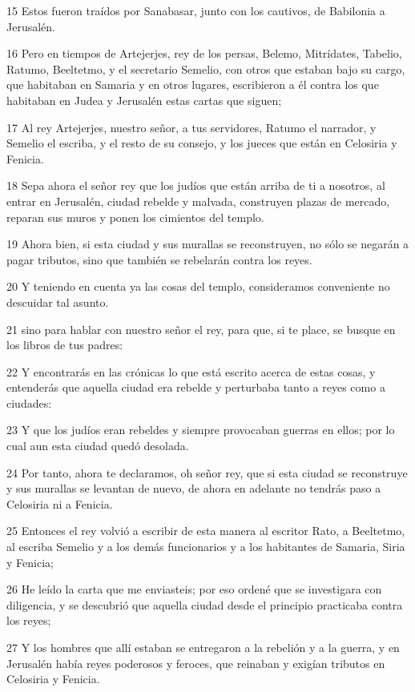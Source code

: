 \par 15 Estos fueron traídos por Sanabasar, junto con los cautivos, de Babilonia a Jerusalén.
\par 16 Pero en tiempos de Artejerjes, rey de los persas, Belemo, Mitrídates, Tabelio, Ratumo, Beeltetmo, y el secretario Semelio, con otros que estaban bajo su cargo, que habitaban en Samaria y en otros lugares, escribieron a él contra los que habitaban en Judea y Jerusalén estas cartas que siguen;
\par 17 Al rey Artejerjes, nuestro señor, a tus servidores, Ratumo el narrador, y Semelio el escriba, y el resto de su consejo, y los jueces que están en Celosiria y Fenicia.
\par 18 Sepa ahora el señor rey que los judíos que están arriba de ti a nosotros, al entrar en Jerusalén, ciudad rebelde y malvada, construyen plazas de mercado, reparan sus muros y ponen los cimientos del templo.
\par 19 Ahora bien, si esta ciudad y sus murallas se reconstruyen, no sólo se negarán a pagar tributos, sino que también se rebelarán contra los reyes.
\par 20 Y teniendo en cuenta ya las cosas del templo, consideramos conveniente no descuidar tal asunto.
\par 21 sino para hablar con nuestro señor el rey, para que, si te place, se busque en los libros de tus padres:
\par 22 Y encontrarás en las crónicas lo que está escrito acerca de estas cosas, y entenderás que aquella ciudad era rebelde y perturbaba tanto a reyes como a ciudades:
\par 23 Y que los judíos eran rebeldes y siempre provocaban guerras en ellos; por lo cual aun esta ciudad quedó desolada.
\par 24 Por tanto, ahora te declaramos, oh señor rey, que si esta ciudad se reconstruye y sus murallas se levantan de nuevo, de ahora en adelante no tendrás paso a Celosiria ni a Fenicia.
\par 25 Entonces el rey volvió a escribir de esta manera al escritor Rato, a Beeltetmo, al escriba Semelio y a los demás funcionarios y a los habitantes de Samaria, Siria y Fenicia;
\par 26 He leído la carta que me enviasteis; por eso ordené que se investigara con diligencia, y se descubrió que aquella ciudad desde el principio practicaba contra los reyes;
\par 27 Y los hombres que allí estaban se entregaron a la rebelión y a la guerra, y en Jerusalén había reyes poderosos y feroces, que reinaban y exigían tributos en Celosiria y Fenicia.
